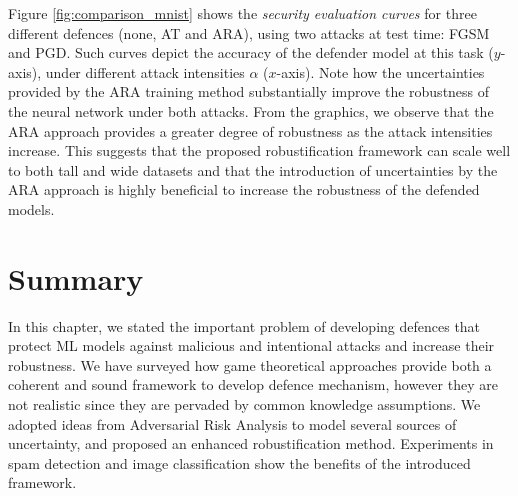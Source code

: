 Figure \ref{fig:comparison_mnist} shows the \emph{security evaluation curves} \parencite{BIGGIO2018317} for three different defences (none, AT and ARA), using two attacks at test time: FGSM and PGD. Such curves depict the accuracy of the defender model at this task ($y$-axis), under different attack intensities $\alpha$ ($x$-axis). Note how the uncertainties provided by the ARA training method substantially improve the robustness of the neural network under both attacks. From the graphics, we observe that the ARA approach provides a greater degree of robustness as the attack intensities increase. This suggests that the proposed robustification framework can scale well to both tall and wide datasets and that the introduction of uncertainties by the ARA approach is highly beneficial to increase the robustness of the defended models.





\section{Summary}

In this chapter, we stated the important problem of developing defences that protect ML models against malicious and intentional attacks and increase their robustness. We have surveyed how game theoretical approaches provide both a coherent and sound framework to develop defence mechanism, however they are not realistic since they are pervaded by common knowledge assumptions. We adopted ideas from Adversarial Risk Analysis to model several sources of uncertainty, and proposed an enhanced robustification method. Experiments in spam detection and image classification show the benefits of the introduced framework.